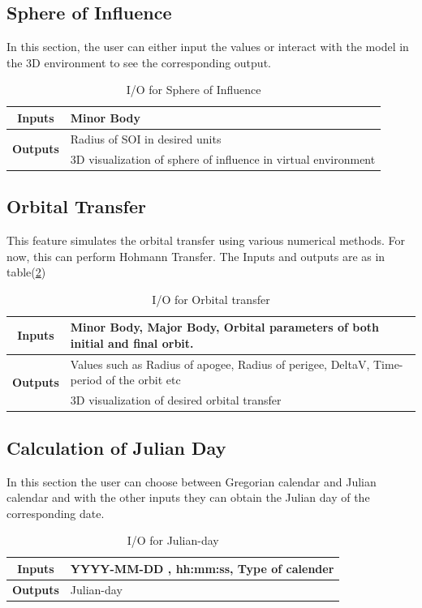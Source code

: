 \subsection{Sphere of Influence}
In this section, the user can either input the values or interact with the model in the 3D environment to see the corresponding output.
\begin{table}[H]
\centering
\begin{tabular}{@{}rl@{}}
\toprule
\multicolumn{1}{c}{\textbf{Inputs}} & Minor Body                     \\ \midrule
\multirow{2}{*}{\textbf{Outputs}}   & Radius of SOI in desired units \\ \cmidrule(l){2-2} 
                           & 3D visualization of sphere of influence in virtual environment                         \\ \bottomrule
\end{tabular}
\caption{I/O for Sphere of Influence}
\label{soi}
\end{table}
\subsection{Orbital Transfer}
This feature simulates the orbital transfer using various numerical methods. For now, this can perform Hohmann Transfer. The Inputs and outputs are as in table(\ref{tab:ot})
\begin{table}[H]
\centering
\begin{tabular}{@{}cl@{}}
\toprule
\multicolumn{1}{c}{\textbf{Inputs}} & Minor Body, Major Body, Orbital parameters of both initial and final orbit.                     \\ \midrule
\multirow{2}{*}{\textbf{Outputs}}   & Values such as Radius of apogee, Radius of perigee, DeltaV, Time-period of the orbit etc \\ \cmidrule(l){2-2} 
                           & 3D visualization of desired orbital transfer \\ \bottomrule
\end{tabular}
\caption{I/O for Orbital transfer}
\label{tab:ot}
\end{table}
\subsection{Calculation of Julian Day}
In this section the user can choose between Gregorian calendar and Julian calendar and with the other inputs they can obtain the Julian day of the corresponding date. 
\begin{table}[H]
\centering
\begin{tabular}{@{}cl@{}}
\toprule
\textbf{Inputs}  & YYYY-MM-DD , hh:mm:ss, Type of calender \\ \midrule
\textbf{Outputs} & Julian-day  \\ \bottomrule                                              
\end{tabular}
\caption{I/O for Julian-day}
\label{tab:jd}
\end{table}
